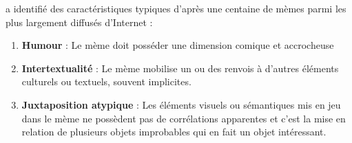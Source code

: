 \cite{Bauckhage2011} a identifié des caractéristiques typiques d{\textquoteright}après une centaine de mèmes parmi les plus largement diffusés d{\textquoteright}Internet  :

\begin{enumerate}
\item 
\textbf{Humour} : Le mème doit posséder une dimension comique et accrocheuse
\item \textbf{Intertextualité} : Le mème mobilise un ou des renvois à d{\textquoteright}autres éléments culturels ou textuels, souvent implicites.
\item \textbf{Juxtaposition atypique} : Les éléments visuels ou sémantiques mis en jeu dans le mème ne possèdent pas de corrélations apparentes et c{\textquoteright}est la mise en relation de plusieurs objets improbables qui en fait un objet intéressant.
\end{enumerate}

